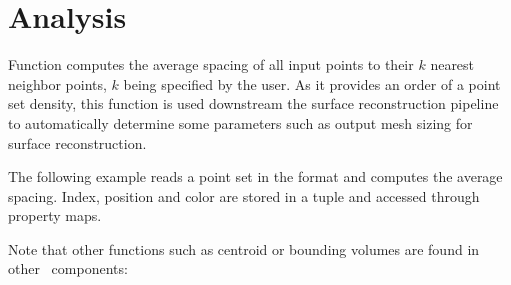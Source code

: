 \section{Analysis}

Function  computes the average spacing of all input points to their $k$ nearest neighbor points, $k$ being specified by the user. As it provides an order of a point set density, this function is used downstream the surface reconstruction pipeline to automatically determine some parameters such as output mesh sizing for surface reconstruction. \\

\ccExample

The following example reads a point set in the  format and computes the average spacing. Index, position and color are stored in a tuple and accessed through property maps.

Note that other functions such as centroid or bounding volumes are found in other \cgal\ components: \\
  \\
  \\
  \\

